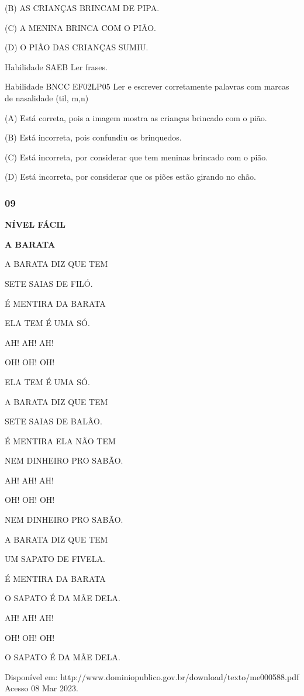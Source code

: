 (B) AS CRIANÇAS BRINCAM DE PIPA.

(C) A MENINA BRINCA COM O PIÃO.

(D) O PIÃO DAS CRIANÇAS SUMIU.

Habilidade SAEB Ler frases.

Habilidade BNCC EF02LP05 Ler e escrever corretamente palavras com marcas
de nasalidade (til, m,n)

(A) Está correta, pois a imagem mostra as crianças brincado com o pião.

(B) \protect\hypertarget{_Hlk129156663}{}{}Está incorreta, pois
confundiu os brinquedos.

(C) Está incorreta, por considerar que tem meninas brincado com o pião.

(D) Está incorreta, por considerar que os piões estão girando no chão.

\subsubsection{09}\label{section-102}

\textbf{NÍVEL FÁCIL}

\textbf{A BARATA}

A BARATA DIZ QUE TEM

SETE SAIAS DE FILÓ.

É MENTIRA DA BARATA

ELA TEM É UMA SÓ.

AH! AH! AH!

OH! OH! OH!

ELA TEM É UMA SÓ.

A BARATA DIZ QUE TEM

SETE SAIAS DE BALÃO.

É MENTIRA ELA NÃO TEM

NEM DINHEIRO PRO SABÃO.

AH! AH! AH!

OH! OH! OH!

NEM DINHEIRO PRO SABÃO.

A BARATA DIZ QUE TEM

UM SAPATO DE FIVELA.

É MENTIRA DA BARATA

O SAPATO É DA MÃE DELA.

AH! AH! AH!

OH! OH! OH!

O SAPATO É DA MÃE DELA.

Disponível em:
http://www.dominiopublico.gov.br/download/texto/me000588.pdf Acesso 08
Mar 2023.

